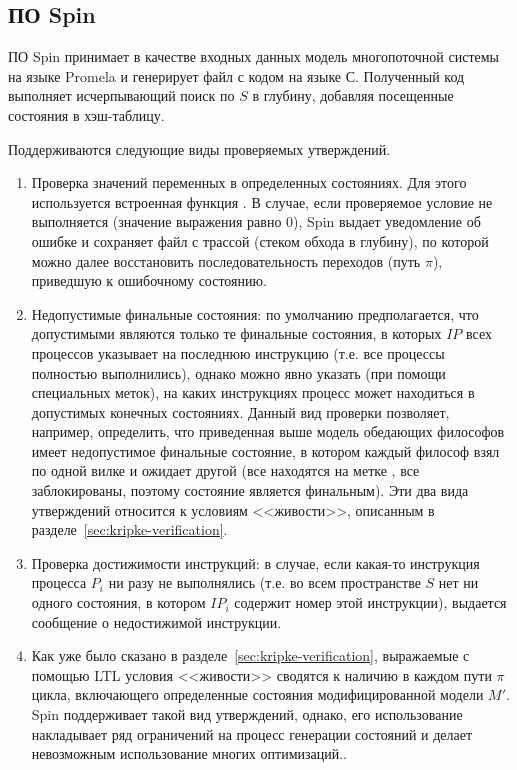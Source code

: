 \subsection{ПО Spin}
\label{sec:spin}

ПО Spin принимает в качестве входных данных модель многопоточной системы на языке Promela
и генерирует файл с кодом на языке С. Полученный код выполняет исчерпывающий поиск по $S$
в глубину, добавляя посещенные состояния в хэш-таблицу.

Поддерживаются следующие виды проверяемых утверждений. 

\begin{enumerate}
\item Проверка значений переменных в определенных состояниях. Для этого используется
  встроенная функция . В случае, если проверяемое условие не выполняется
  (значение выражения равно 0), Spin выдает уведомление об ошибке и сохраняет файл с
  трассой (стеком обхода в глубину), по которой можно далее восстановить
  последовательность переходов (путь $\pi$), приведшую к ошибочному состоянию.

\item Недопустимые финальные состояния: по умолчанию предполагается, что допустимыми
  являются только те финальные состояния, в которых $IP$ всех процессов указывает на
  последнюю инструкцию (т.е. все процессы полностью выполнились), однако можно явно
  указать (при помощи специальных меток), на каких инструкциях процесс может находиться в
  допустимых конечных состояниях. Данный вид проверки позволяет, например, определить, что
  приведенная выше модель обедающих философов имеет недопустимое финальные состояние, в
  котором каждый философ взял по одной вилке и ожидает другой (все находятся на метке
  , все заблокированы, поэтому состояние является финальным). Эти два вида
  утверждений относится к условиям <<живости>>, описанным в
  разделе~\ref{sec:kripke-verification}.

\item Проверка достижимости инструкций: в случае, если какая-то инструкция процесса $P_i$
  ни разу не выполнялись (т.е. во всем пространстве $S$ нет ни одного состояния, в котором
  $IP_i$ содержит номер этой инструкции), выдается сообщение о недостижимой инструкции.

\item Как уже было сказано в разделе~\ref{sec:kripke-verification}, выражаемые с помощью
  LTL условия <<живости>> сводятся к наличию в каждом пути $\pi$ цикла, включающего
  определенные состояния модифицированной модели $M'$. Spin поддерживает такой вид
  утверждений, однако, его использование накладывает ряд ограничений на процесс генерации
  состояний и делает невозможным использование многих оптимизаций.\cite{SpinRoot}.
\end{enumerate}

